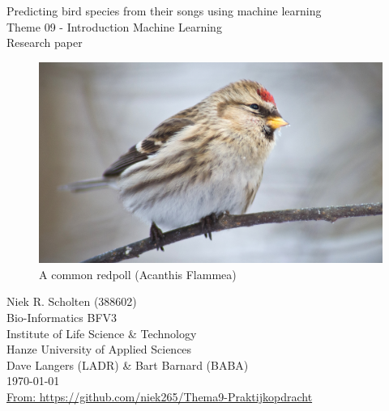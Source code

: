 \documentclass[
]{article}
\author{}
\date{\vspace{-2.5em}}
\begin{document}

\begin{center}

    \Huge{Predicting bird species from their songs using machine learning}\\
    \vspace{\baselineskip}
    \LARGE{Theme 09 - Introduction Machine Learning}\\
    \large{Research paper}\\
    \vspace{\baselineskip}

    \begin{figure}
        \centering\includegraphics[width=\linewidth]{Acanthis_flammea}
        \caption{A common redpoll (Acanthis Flammea)}
        \label{fig:Acanthis_flammea}
    \end{figure}

\end{center}
\vspace{\baselineskip}

\normalsize
\vspace*{\fill}
\begin{flushright}
    Niek R. Scholten (388602)\\
    Bio-Informatics BFV3\\
    Institute of Life Science \& Technology\\
    Hanze University of Applied Sciences\\
    Dave Langers (LADR) \& Bart Barnard (BABA)\\
    \today\\
    \href{https://github.com/niek265/Thema9-Praktijkopdracht}{From: https://github.com/niek265/Thema9-Praktijkopdracht}
\end{flushright}
\newpage
\end{document}

